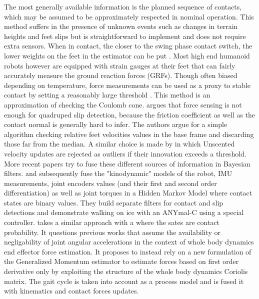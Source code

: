The most generally available information is the planned sequence of contacts, which may be assumed to be approximately respected in nominal operation. 
This method suffers in the presence of unknown events such as changes in terrain heights and feet slips but is straightforward to implement and 
does not require extra sensors. When in contact, the closer to the swing phase contact switch, the lower weights on the feet in the estimator can be put 
\cite{leziart2021implementation, bledt2018contact}. Most high end humanoid robots however \cite{stasse2017talos, englsberger2014overview} are 
equipped with strain gauges at their feet that can fairly accurately measure the ground reaction forces (GRFs). 
Though often biased depending on temperature, force measurements can be used as a proxy to stable contact by setting a reasonably large threshold \cite{fallon2014drift}. 
This method is an approximation of checking the Coulomb cone.
\cite{Focchi2015SlipDA} argues that force sensing is not enough for quadruped slip detection, because the friction coefficient
as well as the contact normal is generally hard to infer. The authors argue for a simple algorithm checking relative feet velocities values in the base frame and discarding those
far from the median. A similar choice is made by \cite{bloesch2013stateSlippery} in which Unscented \KalmanF velocity updates are rejected as outliers if their innovation exceeds a threshold.  
More recent papers try to fuse these different sources of information in Bayesian filters. \cite{hwangbo2016probabilistic} and subsequently \cite{jenelten2019dynamic} fuse 
the  "kinodynamic" models of the robot, IMU measurements, joint encoders values (and their first and second order differentiation) as well as
joint torques in a Hidden Markov Model where contact states are binary values. They build separate filters for contact and slip detections and demonstrate walking on ice with an ANYmal-C using a special controller.
\cite{bledt2018contact} takes a similar approach with a \KalmanF where the sates are contact probability. It questions previous works that assume the availability 
\cite{hwangbo2016probabilistic} or negligability \cite{camurri2017probabilistic} of joint angular accelerations in the context of whole body dynamics end effector force estimation.
It proposes to instead rely on a new formulation of the Generalized Momentum estimator to estimate forces based on first order derivative only by exploiting the 
structure of the whole body dynamics Coriolis matrix. The gait cycle is taken into account as a process model and is fused it with kinematics and contact forces updates.  

